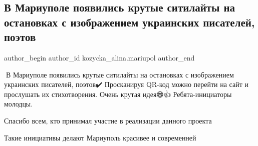  
 
 
 
 

\subsection{В Мариуполе появились крутые ситилайты на остановках с изображением украинских писателей, поэтов}
\label{sec:11_06_2020.fb.kozycka_alina.mariupol.1.ostanovki_sitilajty_poety_pisateli}

\ifcmt
 author_begin
   author_id kozycka_alina.mariupol
 author_end
\fi

📣В Мариуполе появились крутые ситилайты на остановках с изображением
украинских писателей, поэтов✔️ Просканируя QR-код можно перейти на сайт и
прослушать их стихотворения. Очень крутая идея😁👍 Ребята-инициаторы молодцы. 

Спасибо всем, кто принимал участие в реализации данного проекта🙏

Такие инициативы делают Мариуполь красивее и современней

💙💛

